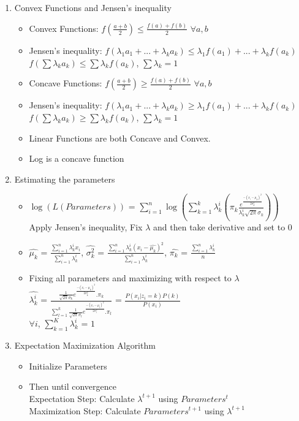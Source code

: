 \documentclass[a4paper]{article}
\begin{document}
\begin{enumerate}
\begin{itemize}
    \end{itemize}
    \item Convex Functions and Jensen's inequality
    \begin{itemize}
        \item Convex Functions: $f(\frac{a+b}{2}) \leq \frac{f(a) + f(b)}{2}$ $\forall a,b$\\
        \item Jensen's inequality: $f(\lambda_1a_1 + ... + \lambda_ka_k)\leq \lambda_1f(a_1) + ... + \lambda_kf(a_k)$\\
        $f(\sum \lambda_ka_k)\leq\sum\lambda_kf(a_k)$, $\sum \lambda_k = 1$
        \item Concave Functions: $f(\frac{a+b}{2}) \geq \frac{f(a) + f(b)}{2}$ $\forall a,b$
        \item Jensen's inequality: $f(\lambda_1a_1 + ... + \lambda_ka_k)\geq \lambda_1f(a_1) + ... + \lambda_kf(a_k)$\\
        $f(\sum \lambda_ka_k)\geq\sum\lambda_kf(a_k)$, $\sum \lambda_k = 1$
        \item Linear Functions are both Concave and Convex.
        \item Log is a concave function
    \end{itemize}
    \item Estimating the parameters
    \begin{itemize}
        \item $\log(L(Parameters))$ = $\sum_{i=1}^n\log(\sum_{k=1}^k \lambda_k^i (\pi_k\frac{e^{\frac{-(x_i - \mu_k)^2}{2\sigma_k^2}}}{\lambda_k^i\sqrt{2\pi}\sigma_k}))$\\
        Apply Jensen's inequality, Fix $\lambda$ and then take derivative and set to 0
        \item $\hat{\mu_k}$ = $\frac{\sum_{i=1}^n\lambda_k^ix_i}{\sum_{i=1}^n\lambda_k^i}$, $\hat{\sigma_k^2}$ = $\frac{\sum_{i=1}^n\lambda_k^i(x_i - \hat{\mu_k})^2}{\sum_{i=1}^n\lambda_k^i}$, $\hat{\pi_k}$ = $\frac{\sum_{i=1}^n\lambda_k^i}{n}$
        \item Fixing all parameters and maximizing with respect to $\lambda$\\
        $\hat{\lambda_k^i}$ = $\frac{\frac{1}{\sqrt{2\pi}\sigma_k}e^{\frac{-(x_i - \mu_k)^2}{2\sigma_k^2}} . \pi_k}{\sum_{l=1}^k\frac{1}{\sqrt{2\pi}\sigma_l}e^{\frac{-(x_i - \mu_l)^2}{2\sigma_l^2}} . \pi_l}$ = $\frac{P(x_i|z_i=k)P(k)}{P(x_i)}$\\
        $\forall i$, $\sum_{k=1}^K\lambda^i_k$ = $1$
    \end{itemize}
    \item Expectation Maximization Algorithm
    \begin{itemize}
        \item Initialize Parameters
        \item Then until convergence\\
        Expectation Step: Calculate $\lambda^{t+1}$ using $Parameters^t$\\
        Maximization Step: Calculate $Parameters^{t+1}$ using $\lambda^{t+1}$
    \end{itemize}
\end{enumerate}
\end{document}
